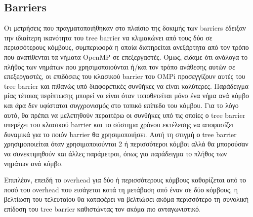 \subsection{Barriers}
Οι μετρήσεις που πραγματοποιήθηκαν στο πλαίσιο της δοκιμής των barriers έδειξαν την ιδιαίτερη ικανότητα του tree barrier να κλιμακώνει από τους δύο σε περισσότερους κόμβους, συμπεριφορά η οποία διατηρείται ανεξάρτητα από τον τρόπο που ανατίθενται τα νήματα OpenMP σε επεξεργαστές. Όμως, είδαμε ότι ανάλογα το πλήθος των νημάτων που χρησιμοποιούνται ή/και τον τρόπο ανάθεσης αυτών σε επεξεργαστές, οι επιδόσεις του κλασικού barrier του OMPi προσεγγίζουν αυτές του tree barrier και πιθανώς υπό διαφορετικές συνθήκες να είναι καλύτερες. Παράδειγμα μίας τέτοιας περίπτωσης μπορεί να είναι όταν τοποθετείται μόνο ένα νήμα ανά κόμβο και άρα δεν υφίσταται συγχρονισμός στο τοπικό επίπεδο του κόμβου. Για το λόγο αυτό, θα πρέπει να μελετηθούν περαιτέρω οι συνθήκες υπό τις οποίες ο tree barrier υπερέχει του κλασικού barrier και το σύστημα χρόνου εκτέλεσης να αποφασίζει δυναμικά για το ποιόν barrier θα χρησιμοποιήσει. Αυτή τη στιγμή ο tree barrier χρησιμοποιείται όταν χρησιμοποιούνται 2 ή περισσότεροι κόμβοι αλλά θα μπορούσαν να συνεκτιμηθούν και άλλες παράμετροι, όπως για παράδειγμα το πλήθος των νημάτων ανά κόμβο.

Επιπλέον, επειδή το overhead για δύο ή περισσότερους κόμβους καθορίζεται από το ποσό του overhead που εισάγεται κατά τη μετάβαση από έναν σε δύο κόμβους, η βελτίωση του τελευταίου θα καταφέρει να βελτιώσει ακόμα περισσότερο τη συνολική επίδοση του tree barrier καθιστώντας τον ακόμα πιο ανταγωνιστικό.